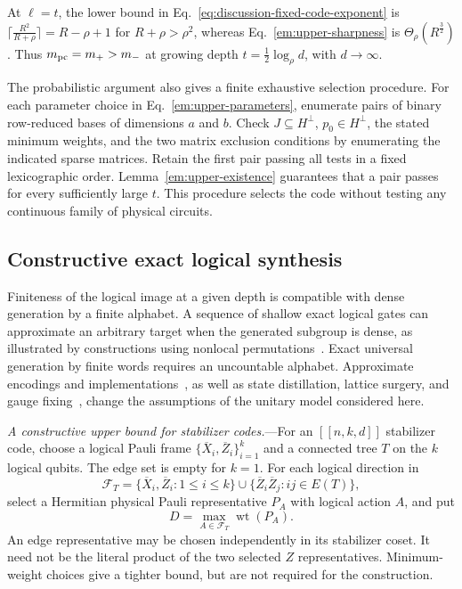 \documentclass[aps,prl,reprint,notitlepage,nofootinbib,nobibnotes]{revtex4-2}
\begin{document}
At $\ell=t$, the lower bound in Eq.~\eqref{eq:discussion-fixed-code-exponent} is $\lceil
\frac{R^2}{R+\rho}\rceil=R-\rho+1$ for $R+\rho>\rho^2$, whereas Eq.~\eqref{em:upper-sharpness} is
$\Theta_\rho(R^{\frac{3}{2}})$. Thus $m_{\rm pc}=m_+>m_-$ at growing depth $t=\frac{1}{2}\log_\rho
d$, with $d\to\infty$.

The probabilistic argument also gives a finite exhaustive selection procedure. For each parameter
choice in Eq.~\eqref{em:upper-parameters}, enumerate pairs of binary row-reduced bases of
dimensions $a$ and $b$. Check $J\subseteq H^\perp$, $p_0\in H^\perp$, the stated minimum weights,
and the two matrix exclusion conditions by enumerating the indicated sparse matrices. Retain the
first pair passing all tests in a fixed lexicographic order. Lemma~\ref{em:upper-existence}
guarantees that a pair passes for every sufficiently large $t$. This procedure selects the code
without testing any continuous family of physical circuits.


\subsection*{Constructive exact logical synthesis}
\label{sm:exact-synthesis}

Finiteness of the logical image at a given depth is compatible with dense generation by a finite
alphabet. A sequence of shallow exact logical gates can approximate an arbitrary target when the
generated subgroup is dense, as illustrated by constructions using nonlocal
permutations~\cite{ZhuLavasaniBarkeshli}. Exact universal generation by finite words requires an
uncountable alphabet. Approximate encodings and
implementations~\cite{Faist,WoodsAlhambra,KubicaDemkowicz,ZhouLiuJiang,LiuZhou}, as well as state
distillation, lattice surgery, and gauge
fixing~\cite{BravyiKitaev,Horsman,PaetznickReichardt,BombinGauge,Webster}, change the assumptions
of the unitary model considered here.

\textit{A constructive upper bound for stabilizer codes.}---For an $[[n,k,d]]$ stabilizer
code, choose a logical Pauli frame $\{\overline X_i,\overline Z_i\}_{i=1}^k$ and a connected tree
$T$ on the $k$ logical qubits. The edge set is empty for $k=1$. For each logical direction in
\begin{equation}\label{eq:logical-frame-set}
 \mathcal F_T=
 \{\overline X_i,\overline Z_i:1\le i\le k\}
 \cup\{\overline Z_i\overline Z_j:ij\in E(T)\},
\end{equation}
select a Hermitian physical Pauli representative $P_A$ with logical action $A$, and put
\begin{equation}\label{eq:frame-weight}
 D=\max_{A\in\mathcal F_T}\operatorname{wt}(P_A).
\end{equation}
An edge representative may be chosen independently in its stabilizer coset. It need not be the
literal product of the two selected $Z$ representatives. Minimum-weight choices give a tighter
bound, but are not required for the construction.
\end{document}
